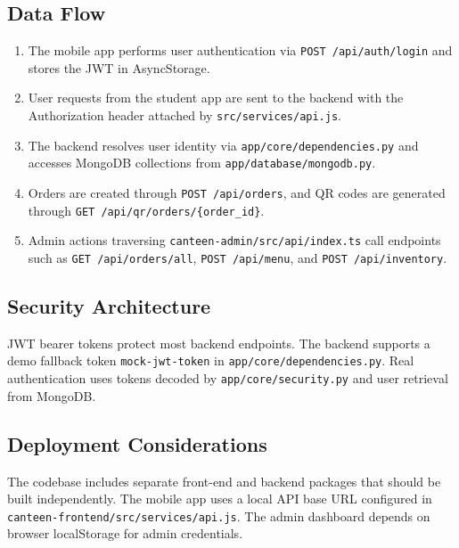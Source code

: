 \subsection{Data Flow}
\begin{enumerate}[nosep]
  \item The mobile app performs user authentication via \texttt{POST /api/auth/login} and stores the JWT in AsyncStorage.
  \item User requests from the student app are sent to the backend with the Authorization header attached by \texttt{src/services/api.js}.
  \item The backend resolves user identity via \texttt{app/core/dependencies.py} and accesses MongoDB collections from \texttt{app/database/mongodb.py}.
  \item Orders are created through \texttt{POST /api/orders}, and QR codes are generated through \texttt{GET /api/qr/orders/\{order\_id\}}.
  \item Admin actions traversing \texttt{canteen-admin/src/api/index.ts} call endpoints such as \texttt{GET /api/orders/all}, \texttt{POST /api/menu}, and \texttt{POST /api/inventory}.
\end{enumerate}

\subsection{Security Architecture}
JWT bearer tokens protect most backend endpoints. The backend supports a demo fallback token \texttt{mock-jwt-token} in \texttt{app/core/dependencies.py}. Real authentication uses tokens decoded by \texttt{app/core/security.py} and user retrieval from MongoDB.

\subsection{Deployment Considerations}
The codebase includes separate front-end and backend packages that should be built independently. The mobile app uses a local API base URL configured in \texttt{canteen-frontend/src/services/api.js}. The admin dashboard depends on browser localStorage for admin credentials.
